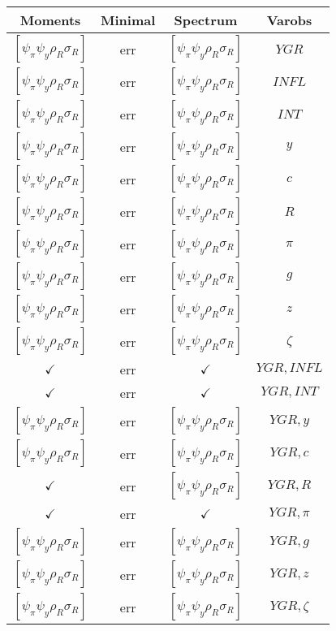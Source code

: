 \documentclass[a4paper,10pt]{article}
\begin{document}
\centering
\begin{longtable}{|c|c|c|c|}
\hline
Moments & Minimal & Spectrum & Varobs \\
\hline
$[\psi_\pi \psi_y \rho_R \sigma_R ]$ & err & $[\psi_\pi \psi_y \rho_R \sigma_R ]$ & ${YGR}$ \\
\hline
$[\psi_\pi \psi_y \rho_R \sigma_R ]$ & err & $[\psi_\pi \psi_y \rho_R \sigma_R ]$ & ${INFL}$ \\
\hline
$[\psi_\pi \psi_y \rho_R \sigma_R ]$ & err & $[\psi_\pi \psi_y \rho_R \sigma_R ]$ & ${INT}$ \\
\hline
$[\psi_\pi \psi_y \rho_R \sigma_R ]$ & err & $[\psi_\pi \psi_y \rho_R \sigma_R ]$ & ${y}$ \\
\hline
$[\psi_\pi \psi_y \rho_R \sigma_R ]$ & err & $[\psi_\pi \psi_y \rho_R \sigma_R ]$ & ${c}$ \\
\hline
$[\psi_\pi \psi_y \rho_R \sigma_R ]$ & err & $[\psi_\pi \psi_y \rho_R \sigma_R ]$ & ${R}$ \\
\hline
$[\psi_\pi \psi_y \rho_R \sigma_R ]$ & err & $[\psi_\pi \psi_y \rho_R \sigma_R ]$ & ${\pi}$ \\
\hline
$[\psi_\pi \psi_y \rho_R \sigma_R ]$ & err & $[\psi_\pi \psi_y \rho_R \sigma_R ]$ & ${g}$ \\
\hline
$[\psi_\pi \psi_y \rho_R \sigma_R ]$ & err & $[\psi_\pi \psi_y \rho_R \sigma_R ]$ & ${z}$ \\
\hline
$[\psi_\pi \psi_y \rho_R \sigma_R ]$ & err & $[\psi_\pi \psi_y \rho_R \sigma_R ]$ & ${\zeta}$ \\
\hline
$\checkmark$ & err & $\checkmark$ & ${YGR},{INFL}$ \\
\hline
$\checkmark$ & err & $\checkmark$ & ${YGR},{INT}$ \\
\hline
$[\psi_\pi \psi_y \rho_R \sigma_R ]$ & err & $[\psi_\pi \psi_y \rho_R \sigma_R ]$ & ${YGR},{y}$ \\
\hline
$[\psi_\pi \psi_y \rho_R \sigma_R ]$ & err & $[\psi_\pi \psi_y \rho_R \sigma_R ]$ & ${YGR},{c}$ \\
\hline
$\checkmark$ & err & $[\psi_\pi \psi_y \rho_R \sigma_R ]$ & ${YGR},{R}$ \\
\hline
$\checkmark$ & err & $\checkmark$ & ${YGR},{\pi}$ \\
\hline
$[\psi_\pi \psi_y \rho_R \sigma_R ]$ & err & $[\psi_\pi \psi_y \rho_R \sigma_R ]$ & ${YGR},{g}$ \\
\hline
$[\psi_\pi \psi_y \rho_R \sigma_R ]$ & err & $[\psi_\pi \psi_y \rho_R \sigma_R ]$ & ${YGR},{z}$ \\
\hline
$[\psi_\pi \psi_y \rho_R \sigma_R ]$ & err & $[\psi_\pi \psi_y \rho_R \sigma_R ]$ & ${YGR},{\zeta}$ \\

\end{longtable}
\end{document}
